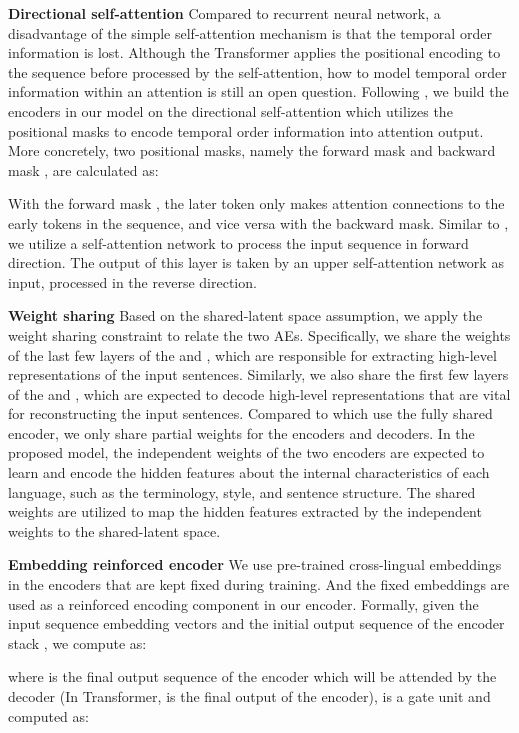 \documentclass[11pt,a4paper]{article}
\begin{document}
\textbf{Directional self-attention}
Compared to recurrent neural network, a disadvantage of the simple self-attention mechanism is that the temporal order information is lost. Although the Transformer applies the positional encoding to the sequence before processed by the self-attention, how to model temporal order information within an attention is still an open question. Following \cite{Shen2017DiSAN}, we build the encoders in our model on the directional self-attention which utilizes the positional masks to encode temporal order information into attention output. More concretely, two positional masks, namely the forward mask  and backward mask , are calculated as:


With the forward mask , the later token only makes attention connections to the early tokens in the sequence, and vice versa with the backward mask. Similar to \cite{zhou2016deep,wang2017deep}, we utilize a self-attention network to process the input sequence in forward direction. The output of this layer is taken by an upper self-attention network as input, processed in the reverse direction.

\textbf{Weight sharing} Based on the shared-latent space assumption, we apply the weight sharing constraint to relate the two AEs. Specifically, we share the weights of the last few layers of the  and , which are responsible for extracting high-level representations of the input sentences. Similarly, we also share the first few layers of the  and , which are expected to decode high-level representations that are vital for reconstructing the input sentences. Compared to \cite{cheng2016neural,saha2016correlational} which use the fully shared encoder, we only share partial weights for the encoders and decoders. In the proposed model, the independent weights of the two encoders are expected to learn and encode the hidden features about the internal characteristics of each language, such as the terminology, style, and sentence structure. The shared weights are utilized to map the hidden features extracted by the independent weights to the shared-latent space.

\textbf{Embedding reinforced encoder} We use pre-trained cross-lingual embeddings in the encoders that are kept fixed during training. And the fixed embeddings are used as a reinforced encoding component in our encoder. Formally, given the input sequence embedding vectors  and the initial output sequence of the encoder stack , we compute  as:

where  is the final output sequence of the encoder which will be attended by the decoder (In Transformer,  is the final output of the encoder),  is a gate unit and computed as:
\end{document}
